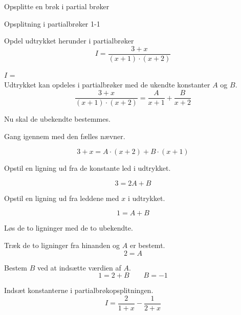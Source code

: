 \documentclass{article}
\begin{document}
Opsplitte en brøk i partial brøker
\tableofcontents

\begin{exercise}{Opsplitning i partialbrøker 1-1}

Opdel udtrykket herunder i partialbrøker
\[
I = \frac{3 + x}{(x + 1) \cdot (x + 2)}
\]

$I$ =  \\

\hint
Udtrykket kan opdeles i partialbrøker med de ukendte konstanter $A$ og $B$.
\[
\frac{3 + x}{(x + 1) \cdot (x + 2)} = 
\frac{A}{x + 1} + \frac{B}{x + 2}
\]

\hint
Nu skal de ubekendte bestemmes.

\hint
Gang igennem med den fælles nævner.

\hint
\[
3 + x = A \cdot (x + 2) + B \cdot (x + 1)
\]

\hint
Opstil en ligning ud fra de konstante led i udtrykket.

\hint
\[
3 = 2A+B
\]

\hint
Opstil en ligning ud fra leddene med $x$ i udtrykket.

\hint
\[
1 = A + B
\]

\hint
Løs de to ligninger med de to ubekendte.

\hint
Træk de to ligninger fra hinanden og $A$ er bestemt.
\[
2 = A
\]

\hint
Bestem $B$ ved at indsætte værdien af $A$.
\[
1 = 2 + B \qquad B = -1
\]

\hint
Indsæt konstanterne i partialbrøkopsplitningen.
\[
I = \frac{2}{1 + x} - \frac{1}{2+x}
\]



\end{exercise}
\end{document}
